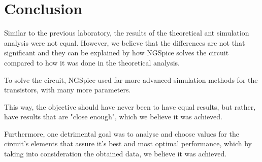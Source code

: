 \section{Conclusion}
\label{sec:conclusion}

\indent

Similar to the previous laboratory, the results of the theoretical ant simulation analysis were not equal.
However, we believe that the differences are not that significant and they can be explained by how NGSpice solves the circuit compared to how it was done in the theoretical analysis.

To solve the circuit, NGSpice used far more advanced simulation methods for the transistors, with many more parameters. 

This way, the objective should have never been to have equal results, but rather, have results that are "close enough", which we believe it was achieved.

Furthermore, one detrimental goal was to analyse and choose values for the circuit's elements that assure it's best and most optimal performance, which by taking into consideration the obtained data, we believe it was achieved.


